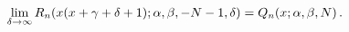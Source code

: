 \[\lim_{\delta\to\infty}\mathop{R_{n}\/}\nolimits\!\left(x(x+\gamma+\delta+1);%
\alpha,\beta,-N-1,\delta\right)=\mathop{Q_{n}\/}\nolimits\!\left(x;\alpha,%
\beta,N\right).\]